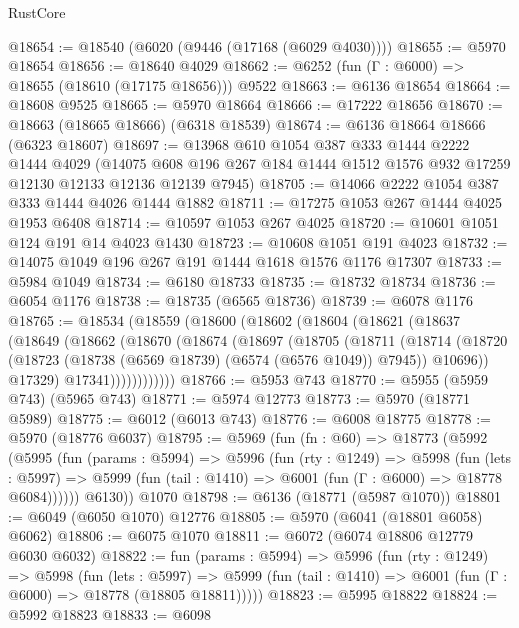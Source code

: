 \begin{lexlean}{RustCore}
\begin{coremodule}
@18654 := @18540 (@6020 (@9446 (@17168 (@6029 @4030))))
@18655 := @5970 @18654
@18656 := @18640 @4029
@18662 := @6252 (fun (Γ : @6000) => @18655 (@18610 (@17175 @18656))) @9522
@18663 := @6136 @18654
@18664 := @18608 @9525
@18665 := @5970 @18664
@18666 := @17222 @18656
@18670 := @18663 (@18665 @18666) (@6318 @18539)
@18674 := @6136 @18664 @18666 (@6323 @18607)
@18697 := @13968
    @610
    @1054
    @387
    @333
    @1444
    @2222
    @1444
    @4029
    (@14075 @608 @196 @267 @184 @1444 @1512 @1576 @932 @17259 @12130 @12133 @12136 @12139 @7945)
@18705 := @14066 @2222 @1054 @387 @333 @1444 @4026 @1444 @1882
@18711 := @17275 @1053 @267 @1444 @4025 @1953 @6408
@18714 := @10597 @1053 @267 @4025
@18720 := @10601 @1051 @124 @191 @14 @4023 @1430
@18723 := @10608 @1051 @191 @4023
@18732 := @14075 @1049 @196 @267 @191 @1444 @1618 @1576 @1176 @17307
@18733 := @5984 @1049
@18734 := @6180 @18733
@18735 := @18732 @18734
@18736 := @6054 @1176
@18738 := @18735 (@6565 @18736)
@18739 := @6078 @1176
@18765 := @18534
    (@18559
      (@18600
        (@18602
          (@18604
            (@18621
              (@18637
                (@18649
                  (@18662
                    (@18670
                      (@18674
                        (@18697
                          (@18705
                            (@18711
                              (@18714
                                (@18720
                                  (@18723 (@18738 (@6569 @18739) (@6574 (@6576 @1049)) @7945))
                                  @10696))
                              @17329)
                            @17341))))))))))))
@18766 := @5953 @743
@18770 := @5955 (@5959 @743) (@5965 @743)
@18771 := @5974 @12773
@18773 := @5970 (@18771 @5989)
@18775 := @6012 (@6013 @743)
@18776 := @6008 @18775
@18778 := @5970 (@18776 @6037)
@18795 := @5969
    (fun (fn : @60) =>
    @18773
      (@5992
        (@5995
          (fun (params : @5994) =>
          @5996
            (fun (rty : @1249) =>
            @5998
              (fun (lets : @5997) =>
              @5999 (fun (tail : @1410) => @6001 (fun (Γ : @6000) => @18778 @6084))))))
        @6130))
    @1070
@18798 := @6136 (@18771 (@5987 @1070))
@18801 := @6049 (@6050 @1070) @12776
@18805 := @5970 (@6041 (@18801 @6058) @6062)
@18806 := @6075 @1070
@18811 := @6072 (@6074 @18806 @12779 @6030 @6032)
@18822 := fun (params : @5994) =>
  @5996
    (fun (rty : @1249) =>
    @5998
      (fun (lets : @5997) =>
      @5999 (fun (tail : @1410) => @6001 (fun (Γ : @6000) => @18778 (@18805 @18811)))))
@18823 := @5995 @18822
@18824 := @5992 @18823
@18833 := @6098

\end{coremodule}
\end{lexlean}
